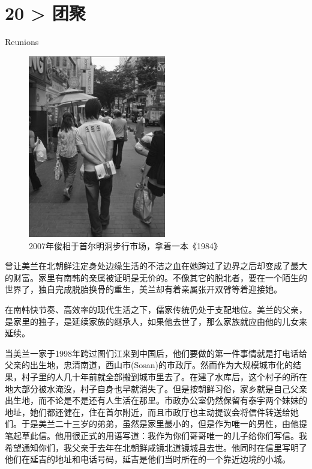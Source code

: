 \chapter*{20 > 团聚}
\vspace{25mm}
\begin{flushright}
	\textcolor{PinYinColor}{\EN \huge{Reunions
			\ \\}}
\end{flushright}

\begin{figure}[!htbp]
	\centering
	\includegraphics[width=6cm]{./Chapters/Images/20.jpg}
	\caption*{2007年俊相于首尔明洞步行市场，拿着一本《1984》}
\end{figure}

曾让美兰在北朝鲜注定身处边缘生活的不洁之血在她跨过了边界之后却变成了最大的财富。家里有南韩的亲属被证明是无价的。不像其它的脱北者，要在一个陌生的世界了，独自完成脱胎换骨的重生，美兰却有着亲属张开双臂等着迎接她。

在南韩快节奏、高效率的现代生活之下，儒家传统仍处于支配地位。美兰的父亲，是家里的独子，是延续家族的继承人，如果他去世了，那么家族就应由他的儿女来延续。

当美兰一家于1998年跨过图们江来到中国后，他们要做的第一件事情就是打电话给父亲的出生地，忠清南道，西山市(Sosan)的市政厅。然而作为大规模城市化的结果，村子里的人几十年前就全部搬到城市里去了。在建了水库后，这个村子的所在地大部分被水淹没，村子自身也早就消失了。但是按朝鲜习俗，家乡就是自己父亲出生地，而不论是不是还有人生活在那里。市政办公室仍然保留有泰宇两个妹妹的地址，她们都还健在，住在首尔附近，而且市政厅也主动提议会将信件转送给她们。于是美兰二十三岁的弟弟，虽然是家里最小的，但是作为唯一的男性，由他提笔起草此信。他用很正式的用语写道：我作为你们哥哥唯一的儿子给你们写信。我希望通知你们，我父亲于去年在北朝鲜咸镜北道镜城县去世。他同时在信里写明了他们在延吉的地址和电话号码，延吉是他们当时所在的一个靠近边境的小城。

